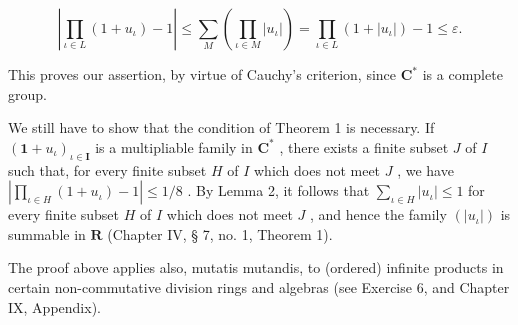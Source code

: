 \[
\left| \prod_ {\iota \in L} (1 + u _ {\iota}) - 1 \right| \leqslant \sum_ {M} \left(\prod_ {\iota \in M} | u _ {\iota} |\right) = \prod_ {\iota \in L} (1 + | u _ {\iota} |) - 1 \leqslant \varepsilon .
\]

This proves our assertion, by virtue of Cauchy's criterion, since \(\mathbf{C}^*\) is a complete group.

We still have to show that the condition of Theorem 1 is necessary. If \((\mathbf{1} + u_{\iota})_{\iota\in \mathbf{I}}\) is a multipliable family in \(\mathbf{C}^*\) , there exists a finite subset \(J\) of \(I\) such that, for every finite subset \(H\) of \(I\) which does not meet \(J\) , we have \(\left|\prod_{\iota\in H}(1 + u_{\iota}) - 1\right| \leqslant 1/8\) . By Lemma 2, it follows that \(\sum_{\iota\in H}|u_{\iota}| \leqslant 1\) for every finite subset \(H\) of \(I\) which does not meet \(J\) , and hence the family \((|u_{\iota}|)\) is summable in \(\mathbf{R}\) (Chapter IV, § 7, no. 1, Theorem 1).

The proof above applies also, mutatis mutandis, to (ordered) infinite products in certain non-commutative division rings and algebras (see Exercise 6, and Chapter IX, Appendix).

